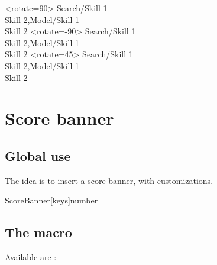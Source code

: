 \documentclass[english,11pt,a4paper]{article}
\begin{document}
\begin{demohigh}[language=latex/latex3,style/main=teal!25,style/code=teal!25]
\PencilSkills[Scale=0.75,BlockWidth=3cm]<rotate=90>{
    Search/Skill 1\\Skill 2,Model/{Skill 1\\Skill 2}}
\hspace{1cm}
\PencilSkills[Scale=0.75,BlockWidth=3cm]<rotate=-90>{
    Search/Skill 1\\Skill 2,Model/{Skill 1\\Skill 2}}
\hspace{1cm}
\PencilSkills[Scale=0.75,BlockWidth=3cm,BlackWhite]<rotate=45>{
    Search/Skill 1\\Skill 2,Model/{Skill 1\\Skill 2}}
\end{demohigh}

\pagebreak

\pagebreak

\section{Score banner}

\subsection{Global use}

The idea is to insert a score banner, with customizations.

\begin{codehigh}[language=latex/latex3,style/main=teal!25,style/code=teal!25]
ScoreBanner[keys]{number}
\end{codehigh}

\begin{demohigh}[language=latex/latex3,style/main=teal!25,style/code=teal!25]
\ScoreBanner{}
\end{demohigh}

\subsection{The macro}

Available  are :
\end{document}
